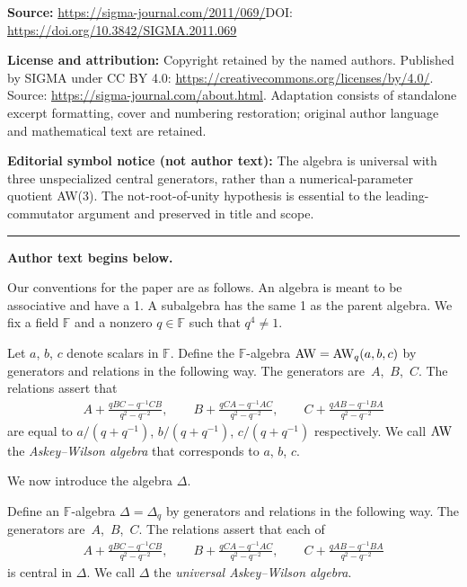 \documentclass[11pt]{article}
\numberwithin{equation}{section}
\begin{document}
\noindent\textbf{Source:} \url{https://sigma-journal.com/2011/069/}\quad DOI: \url{https://doi.org/10.3842/SIGMA.2011.069}\par
\noindent\textbf{License and attribution:} Copyright retained by the named authors. Published by SIGMA under CC BY 4.0: \url{https://creativecommons.org/licenses/by/4.0/}. Source: \url{https://sigma-journal.com/about.html}. Adaptation consists of standalone excerpt formatting, cover and numbering restoration; original author language and mathematical text are retained.\par
\noindent\textbf{Editorial symbol notice (not author text):} The algebra is universal with three unspecialized central generators, rather than a numerical-parameter quotient AW(3). The not-root-of-unity hypothesis is essential to the leading-commutator argument and preserved in title and scope.\par
\medskip\hrule\medskip\noindent\textbf{Author text begins below.}\par
\setcounter{section}{1}
\setcounter{subsection}{0}
\setcounter{subsubsection}{0}
\setcounter{Theorem}{0}
\setcounter{equation}{0}
Our conventions for the paper are as follows.
An algebra is meant to be associative and have a 1.
A subalgebra has the same 1 as the parent algebra.
We f\/ix a f\/ield $\mathbb F$
and  a nonzero $q \in \mathbb F$ such that $q^4\not=1$.

\begin{Definition}
\label{def:aw3}
Let $a$, $b$, $c$ denote scalars in $\mathbb F$.
Def\/ine the $\mathbb F$-algebra ${\rm AW}={\rm AW}_q(a,b,c)$
 by generators and relations in the following way.
The generators are~$A$,~$B$,~$C$.
The relations assert that
\begin{gather*}
 A+ \frac{qBC-q^{-1}CB}{q^2-q^{-2}},
\qquad B+
\frac{qCA-q^{-1}AC}{q^2-q^{-2}},
\qquad
C+
\frac{qAB-q^{-1}BA}{q^2-q^{-2}}
\end{gather*}
are equal to
$
a/(q+q^{-1})$,
$b/(q+q^{-1})$,
$c /(q+q^{-1})$
respectively. We call ${\rm AW}$ the
{\it Askey--Wilson algebra} that corresponds to
$a$, $b$, $c$.
\end{Definition}

 We now introduce the algebra $\Delta$.

\begin{Definition}
\label{def:uaw}
Def\/ine an $\mathbb F$-algebra
$\Delta=\Delta_q$
 by generators and relations in the following way.
The generators are~$A$,~$B$,~$C$.
The relations assert that each of
\begin{gather}
 A+ \frac{qBC-q^{-1}CB}{q^2-q^{-2}},
\qquad B+
\frac{qCA-q^{-1}AC}{q^2-q^{-2}},
\qquad
C+
\frac{qAB-q^{-1}BA}{q^2-q^{-2}}
\label{eq:comlist}
\end{gather}
is central in $\Delta$.
We call $\Delta$ the {\it universal Askey--Wilson algebra}.
\end{Definition}
\end{document}
